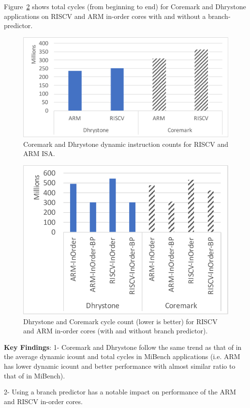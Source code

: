 Figure~\ref{fig:coreperf} shows total cycles (from beginning to end) for Coremark and Dhrystone applications on RISCV and ARM in-order cores with and without a branch-predictor. 

\begin{figure}[]
	\centering
	\includegraphics[width=1\columnwidth]{figures/core-inst.pdf}
	\caption{Coremark and Dhrystone dynamic instruction counts for RISCV and ARM ISA.}
	\label{fig:coreinst}
	\vspace{-1em}
\end{figure} 

\begin{figure}[]
	\centering
	\includegraphics[width=1\columnwidth]{figures/coremark.pdf}
	\caption{Dhrystone and Coremark cycle count (lower is better) for RISCV and ARM in-order cores (with and without branch predictor).}
	\label{fig:coreperf}
	\vspace{-1em}
\end{figure} 

\noindent \textbf{Key Findings}: 1- Coremark and Dhrystone follow the same trend as that of in the average dynamic icount and total cycles in MiBench applications (i.e. ARM has lower dynamic icount and better performance with almost similar ratio to that of in MiBench). 

2- Using a branch predictor has a notable impact on performance of the ARM and RISCV in-order cores. 










